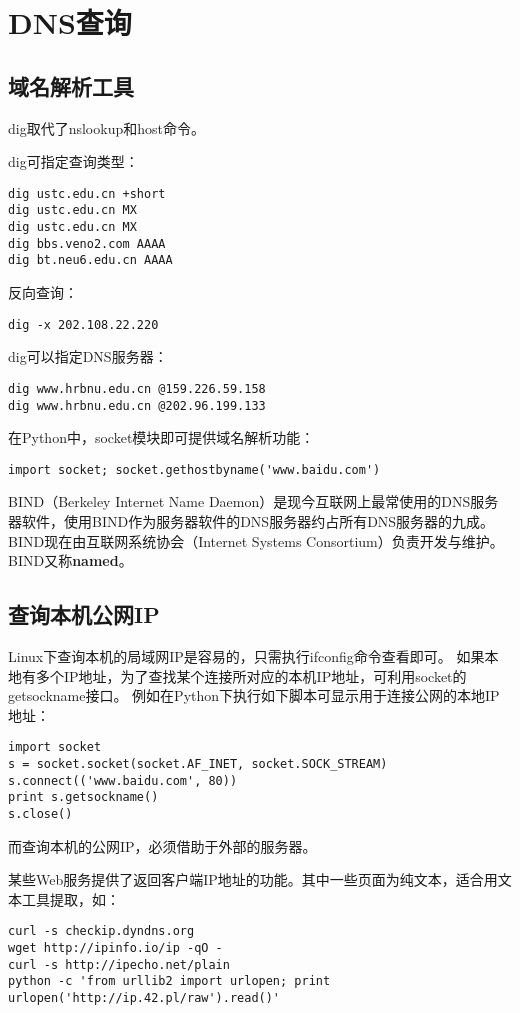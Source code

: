 \section{DNS查询}
\subsection{域名解析工具}
dig取代了nslookup和host命令。

dig可指定查询类型：
\begin{verbatim}
dig ustc.edu.cn +short
dig ustc.edu.cn MX
dig ustc.edu.cn MX
dig bbs.veno2.com AAAA
dig bt.neu6.edu.cn AAAA
\end{verbatim}

反向查询：
\begin{verbatim}
dig -x 202.108.22.220
\end{verbatim}

dig可以指定DNS服务器：
\begin{verbatim}
dig www.hrbnu.edu.cn @159.226.59.158
dig www.hrbnu.edu.cn @202.96.199.133 
\end{verbatim}

在Python中，socket模块即可提供域名解析功能：
\begin{verbatim}
import socket; socket.gethostbyname('www.baidu.com')
\end{verbatim}


BIND（Berkeley Internet Name Daemon）是现今互联网上最常使用的DNS服务器软件，使用BIND作为服务器软件的DNS服务器约占所有DNS服务器的九成。BIND现在由互联网系统协会（Internet Systems Consortium）负责开发与维护。BIND又称\textbf{named}。

\subsection{查询本机公网IP}

Linux下查询本机的局域网IP是容易的，只需执行ifconfig命令查看即可。
如果本地有多个IP地址，为了查找某个连接所对应的本机IP地址，可利用socket的getsockname接口。
例如在Python下执行如下脚本可显示用于连接公网的本地IP地址：
\begin{verbatim}
import socket
s = socket.socket(socket.AF_INET, socket.SOCK_STREAM)
s.connect(('www.baidu.com', 80))
print s.getsockname()
s.close()
\end{verbatim}

而查询本机的公网IP，必须借助于外部的服务器。


某些Web服务提供了返回客户端IP地址的功能。其中一些页面为纯文本，适合用文本工具提取，如：
\begin{verbatim}
curl -s checkip.dyndns.org
wget http://ipinfo.io/ip -qO -
curl -s http://ipecho.net/plain
python -c 'from urllib2 import urlopen; print urlopen('http://ip.42.pl/raw').read()'
\end{verbatim}

